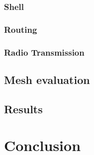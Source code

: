 \subsection{Shell}
\subsection{Routing}
\subsection{Radio Transmission}
\section{Mesh evaluation}
\section{Results}

\chapter{Conclusion}
